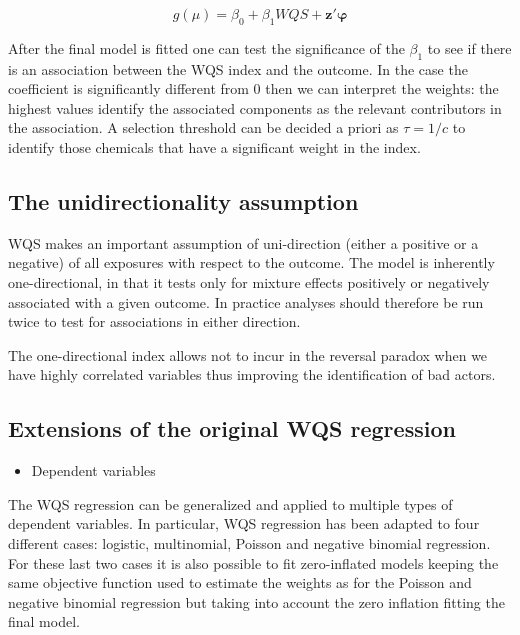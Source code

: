 \documentclass[
]{book}
\providecommand{\tightlist}{%
  \setlength{\itemsep}{0pt}\setlength{\parskip}{0pt}}
\begin{document}
\[g(\mu) = \beta_0 + \beta_1WQS + \boldsymbol{z'\varphi}\]

After the final model is fitted one can test the significance of the \(\beta_1\) to see if there is an association between the WQS index and the outcome. In the case the coefficient is significantly different from 0 then we can interpret the weights: the highest values identify the associated components as the relevant contributors in the association. A selection threshold can be decided a priori as \(\tau = 1/c\) to identify those chemicals that have a significant weight in the index.

\hypertarget{the-unidirectionality-assumption}{%
\subsection{The unidirectionality assumption}\label{the-unidirectionality-assumption}}

WQS makes an important assumption of uni-direction (either a positive or a negative) of all exposures with respect to the outcome. The model is inherently one-directional, in that it tests only for mixture effects positively or negatively associated with a given outcome. In practice analyses should therefore be run twice to test for associations in either direction.

The one-directional index allows not to incur in the reversal paradox when we have highly correlated variables thus improving the identification of bad actors.

\hypertarget{extensions-of-the-original-wqs-regression}{%
\subsection{Extensions of the original WQS regression}\label{extensions-of-the-original-wqs-regression}}

\begin{itemize}
\tightlist
\item
  Dependent variables
\end{itemize}

The WQS regression can be generalized and applied to multiple types of dependent variables. In particular, WQS regression has been adapted to four different cases: logistic, multinomial, Poisson and negative binomial regression. For these last two cases it is also possible to fit zero-inflated models keeping the same objective function used to estimate the weights as for the Poisson and negative binomial regression but taking into account the zero inflation fitting the final model.
\end{document}

